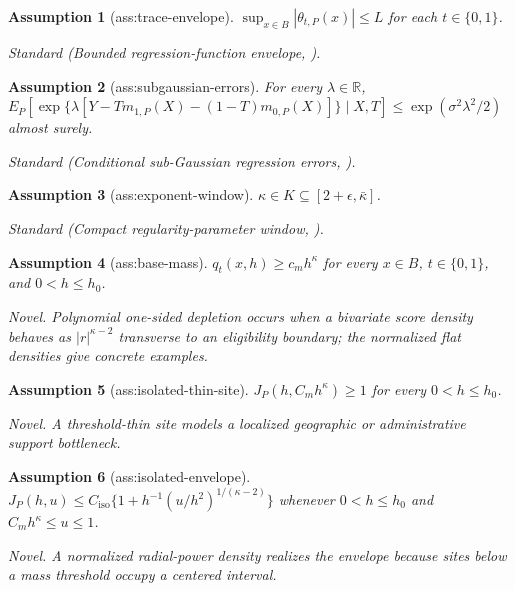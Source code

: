 \documentclass{article}
\newtheorem{assumption}{Assumption}
\begin{document}
\begin{assumption}[ass:trace-envelope]\label{ass:trace-envelope}
\(\sup_{x\in B}|\theta_{t,P}(x)|\leq L\) for each \(t\in\{0,1\}\).
\par\smallskip\noindent\emph{Standard} (Bounded regression-function envelope, \cite{Gaiffas2005DegenerateDesignRates}).
\end{assumption}

\begin{assumption}[ass:subgaussian-errors]\label{ass:subgaussian-errors}
For every \(\lambda\in\mathbb R\), \(E_P[\exp\{\lambda[Y-Tm_{1,P}(X)-(1-T)m_{0,P}(X)]\}\mid X,T]\leq\exp(\sigma^2\lambda^2/2)\) almost surely.
\par\smallskip\noindent\emph{Standard} (Conditional sub-Gaussian regression errors, \cite{Gaiffas2009UniformInhomogeneous}).
\end{assumption}

\begin{assumption}[ass:exponent-window]\label{ass:exponent-window}
\(\kappa\in K\subseteq[2+\epsilon,\bar\kappa]\).
\par\smallskip\noindent\emph{Standard} (Compact regularity-parameter window, \cite{Gaiffas2005DegenerateDesignRates}).
\end{assumption}

\begin{assumption}[ass:base-mass]\label{ass:base-mass}
\(q_t(x,h)\geq c_mh^\kappa\) for every \(x\in B\), \(t\in\{0,1\}\), and \(0<h\leq h_0\).
\par\smallskip\noindent\emph{Novel.} Polynomial one-sided depletion occurs when a bivariate score density behaves as \(|r|^{\kappa-2}\) transverse to an eligibility boundary; the normalized flat densities give concrete examples.
\end{assumption}

\begin{assumption}[ass:isolated-thin-site]\label{ass:isolated-thin-site}
\(J_P(h,C_mh^\kappa)\geq1\) for every \(0<h\leq h_0\).
\par\smallskip\noindent\emph{Novel.} A threshold-thin site models a localized geographic or administrative support bottleneck.
\end{assumption}

\begin{assumption}[ass:isolated-envelope]\label{ass:isolated-envelope}
\(J_P(h,u)\leq C_{\mathrm{iso}}\{1+h^{-1}(u/h^2)^{1/(\kappa-2)}\}\) whenever \(0<h\leq h_0\) and \(C_mh^\kappa\leq u\leq1\).
\par\smallskip\noindent\emph{Novel.} A normalized radial-power density realizes the envelope because sites below a mass threshold occupy a centered interval.
\end{assumption}
\end{document}
